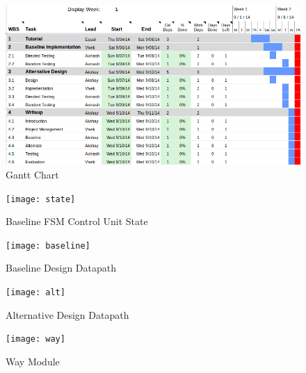 \documentclass[10pt]{article}
\begin{document}

\begin{figure}[b]
\centering
\includegraphics[scale=0.5, angle=90]{gantt}
\caption{Gantt Chart}
\label{fig:gantt}
\end{figure}


\begin{figure}[b]
\centering
\texttt{[image: state]}
\caption{Baseline FSM Control Unit State}
\label{fig:state}
\end{figure}


\begin{figure}[b]
\centering
\texttt{[image: baseline]}
\caption{Baseline Design Datapath}
\label{fig:baseline}
\end{figure}



\begin{figure}[b]
\centering
\texttt{[image: alt]}
\caption{Alternative Design Datapath}
\label{fig:alt}
\end{figure}


\begin{figure}[b]
\centering
\texttt{[image: way]}
\caption{Way Module}
\label{fig:way}
\end{figure}
\end{document}
